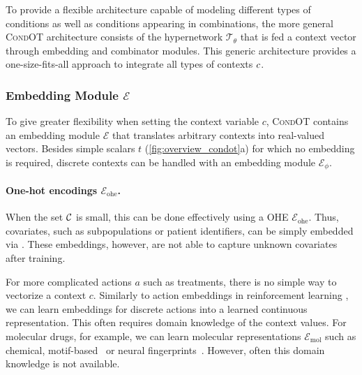 To provide a flexible architecture capable of modeling different types of conditions as well as conditions appearing in combinations, the more general \textsc{CondOT} architecture consists of the hypernetwork $\mathcal{T}_\theta$ that is fed a context vector through embedding and combinator modules. This generic architecture provides a one-size-fits-all approach to integrate all types of contexts $c$.

\subsubsection{Embedding Module $\mathcal{E}$}
 To give greater flexibility when setting the context variable $c$, \textsc{CondOT} contains an embedding module $\mathcal{E}$ that translates arbitrary contexts into real-valued vectors. Besides simple scalars $t$ (\cref{fig:overview_condot}a) for which no embedding is required, discrete contexts can be handled with an embedding module $\mathcal{E}_\phi$.

\paragraph{One-hot encodings $\mathcal{E}_\text{ohe}$.}
When the set ${\mathcal{C}}$ is small, this can be done effectively using a \acrfull{OHE} $\mathcal{E}_\text{ohe}$.
Thus, covariates, such as subpopulations or patient identifiers, can be simply embedded via . These embeddings, however, are not able to capture unknown covariates after training.

For more complicated actions $a$ such as treatments, there is no simple way to vectorize a context $c$. Similarly to action embeddings in reinforcement learning \citep{chandak2019learning, tennenholtz2019natural}, we can learn embeddings for discrete actions into a learned continuous representation.
This often requires domain knowledge of the context values. For molecular drugs, for example, we can learn molecular representations $\mathcal{E}_\text{mol}$ such as chemical, motif-based~\citep{rogers2010extended} or neural fingerprints~\citep{rong2020grover, schwaller2022machine, rogers2010extended}.
However, often this domain knowledge is not available. 


